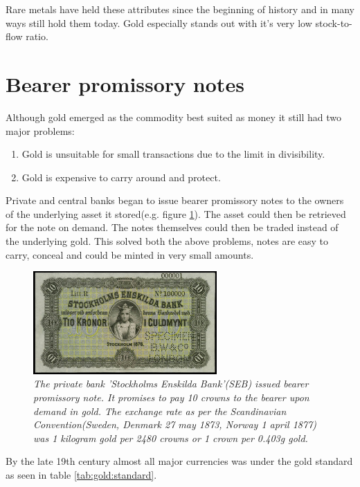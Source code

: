 Rare metals have held these attributes since the beginning of history and in many ways still hold them today. Gold especially stands out with it's very low stock-to-flow ratio.

\section{Bearer promissory notes}

Although gold emerged as the commodity best suited as money it still had two major problems:

\begin{enumerate}
	\item Gold is unsuitable for small transactions due to the limit in divisibility.
	\item Gold is expensive to carry around and protect.
\end{enumerate}

Private and central banks began to issue bearer promissory notes to the owners of the underlying asset it stored(e.g. figure \ref{fig:seb:promissory:note}). 
The asset could then be retrieved for the note on demand. The notes themselves could then be traded instead of the underlying gold. This solved both the above problems, notes are easy to carry, conceal and could be minted in very small amounts. 

\begin{figure}[!htb]

	\centering
	\includegraphics[width=7cm]{external/PrivateBankNoteStockholmEnskildaBank1876.JPG}
	\caption{\textit{The private bank 'Stockholms Enskilda Bank'(SEB) issued bearer
	promissory note. It promises to pay 10 crowns to the bearer upon demand in gold. 
	The exchange rate as per the Scandinavian Convention(Sweden, Denmark 27 may 1873, Norway 1 april 1877)\cite{nordic:crown}
	was 1 kilogram gold per 2480 crowns or 1 crown per 0.403g gold\cite{crown:gold}. 
 }}
	\label{fig:seb:promissory:note}
\end{figure}

By the late 19th century almost all major currencies was under the gold standard as seen in table \ref{tab:gold:standard}.

